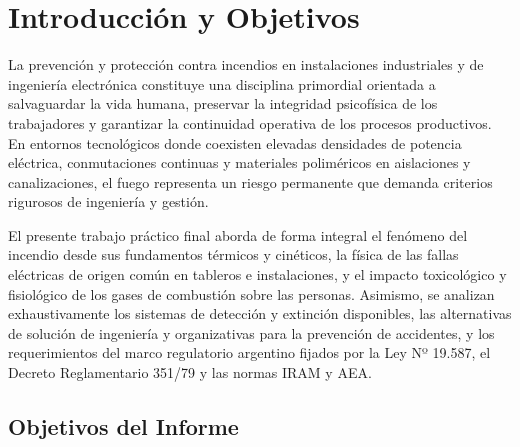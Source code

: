 \chapter{Introducción y Objetivos}
\label{sec.cap1:introduccion}

La prevención y protección contra incendios en instalaciones industriales y de ingeniería electrónica constituye una
disciplina primordial orientada a salvaguardar la vida humana, preservar la integridad psicofísica de los trabajadores y
garantizar la continuidad operativa de los procesos productivos. En entornos tecnológicos donde coexisten elevadas
densidades de potencia eléctrica, conmutaciones continuas y materiales poliméricos en aislaciones y canalizaciones, el
fuego representa un riesgo permanente que demanda criterios rigurosos de ingeniería y gestión.

El presente trabajo práctico final aborda de forma integral el fenómeno del incendio desde sus fundamentos térmicos y
cinéticos, la física de las fallas eléctricas de origen común en tableros e instalaciones, y el impacto toxicológico y
fisiológico de los gases de combustión sobre las personas. Asimismo, se analizan exhaustivamente los sistemas de
detección y extinción disponibles, las alternativas de solución de ingeniería y organizativas para la prevención de
accidentes, y los requerimientos del marco regulatorio argentino fijados por la Ley Nº 19.587, el Decreto Reglamentario
351/79 y las normas IRAM y AEA.

\section{Objetivos del Informe}

